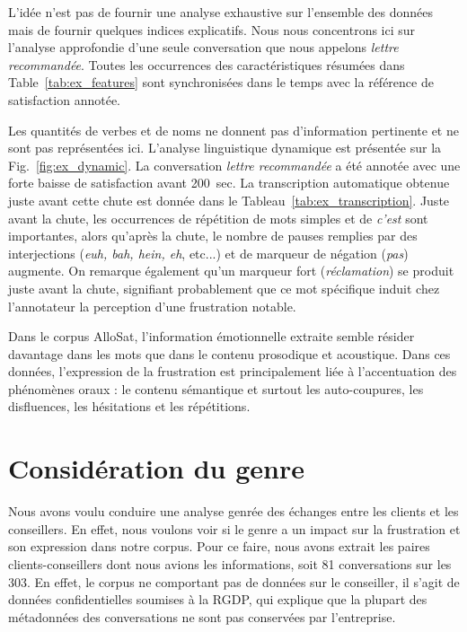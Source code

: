 

L'idée n'est pas de fournir une analyse exhaustive sur l'ensemble des données mais de fournir quelques indices explicatifs. Nous nous concentrons ici sur l'analyse approfondie d'une seule conversation que nous appelons \textit{lettre recommandée}. Toutes les occurrences des caractéristiques résumées dans Table~\ref{tab:ex_features} sont synchronisées dans le temps avec la référence de satisfaction annotée.



Les quantités de verbes et de noms ne donnent pas d'information pertinente et ne sont pas représentées ici. L'analyse linguistique dynamique est présentée sur la Fig.~\ref{fig:ex_dynamic}. La conversation \textit{lettre recommandée} a été annotée avec une forte baisse de satisfaction avant 200~sec. La transcription automatique obtenue juste avant cette chute est donnée dans le Tableau~\ref{tab:ex_transcription}. Juste avant la chute, les occurrences de répétition de mots simples et de \textit{c'est} sont importantes, alors qu'après la chute, le nombre de pauses remplies par des interjections (\textit{euh, bah, hein, eh}, etc...) et de marqueur de négation (\textit{pas}) augmente. On remarque également qu'un marqueur fort (\textit{réclamation}) se produit juste avant la chute, signifiant probablement que ce mot spécifique induit chez l'annotateur la perception d'une frustration notable.



Dans le corpus AlloSat, l'information émotionnelle extraite semble résider davantage dans les mots que dans le contenu prosodique et acoustique. Dans ces données, l'expression de la frustration est principalement liée à l'accentuation des phénomènes oraux : le contenu sémantique et surtout les auto-coupures, les disfluences, les hésitations et les répétitions.

\section{Considération du genre}
Nous avons voulu conduire une analyse genrée des échanges entre les clients et les conseillers. En effet, nous voulons voir si le genre a un impact sur la frustration et son expression dans notre corpus. Pour ce faire, nous avons extrait les paires clients-conseillers dont nous avions les informations, soit 81 conversations sur les 303. En effet, le corpus ne comportant pas de données sur le conseiller, il s'agit de données confidentielles soumises à la RGDP, qui explique que la plupart des métadonnées des conversations ne sont pas conservées par l'entreprise.

